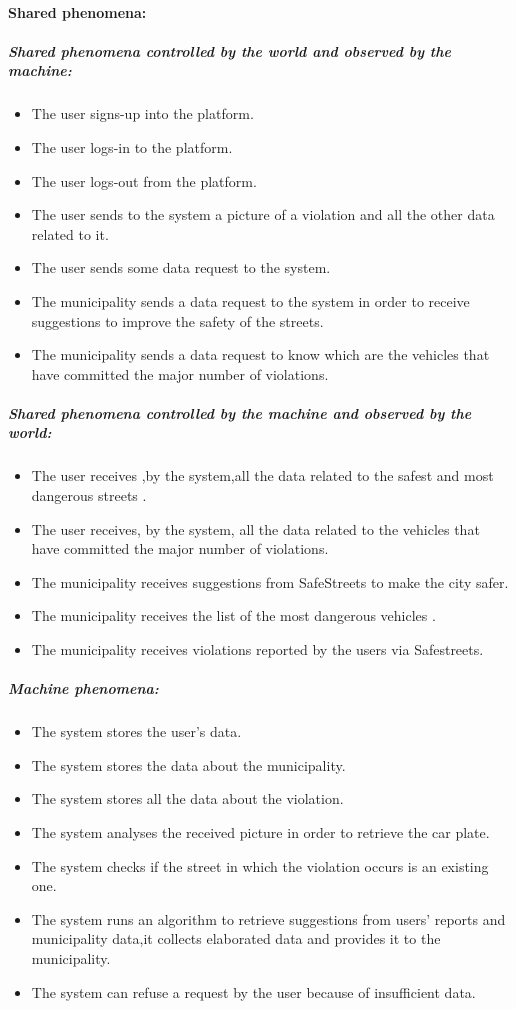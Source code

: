 \documentclass[titlepage]{article}
\begin{document}
\paragraph{Shared phenomena: }
\subparagraph{Shared phenomena controlled by the world and observed by the machine: }
\begin{itemize}
    \item The user signs-up into the platform.
    \item The user logs-in to the platform.
    \item The user logs-out from the platform.
 	\item The user sends to the system a picture of a            	violation and all the other data related to it.
 	\item The user sends some data request to the system.
	\item The municipality sends a data request to the system 		  in order to receive suggestions to improve the 				  safety 	of the streets.
	\item The municipality sends a data request to know which 			  are the vehicles that have committed the major 				  number of violations.
\end{itemize}
\subparagraph{Shared phenomena controlled by the machine and  			observed by the world: }
\begin{itemize}
	\item The user receives ,by the system,all the data 			related to the safest and most dangerous streets .
	\item The user receives, by the system, all the data related to the vehicles that have committed the major number of violations.
	\item The municipality receives suggestions from SafeStreets to make the city safer.
	\item The municipality receives the list of the most 			dangerous vehicles .
	\item The municipality receives violations reported by the users via Safestreets.
	
\end{itemize}
\subparagraph{Machine phenomena: }
\begin{itemize}
	\item The system stores the user's data.
	\item The system stores the data about the 					municipality.
	\item The system stores all the data about the violation.
	\item The system analyses the received picture in order to 	retrieve the car plate.
	\item The system checks if the street in which the 				violation occurs is an existing one.
	\item The system runs an algorithm to retrieve suggestions from users' reports and municipality data,it collects elaborated data and provides it to the municipality.
	\item The system can refuse a request by the user because of insufficient data.
\end{itemize}
\end{document}
